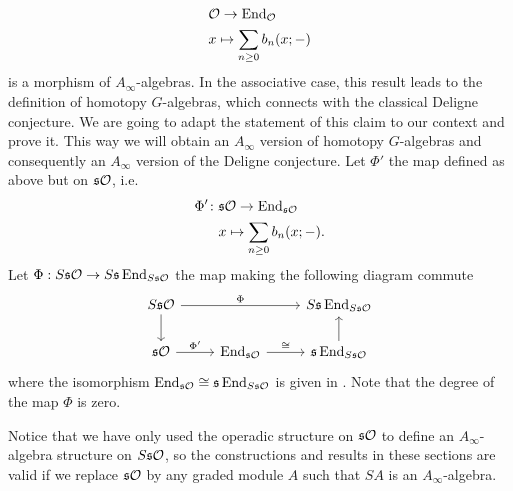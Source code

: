 \documentclass[Thesis.tex]{subfiles}
\begin{document}
\begin{align*}
&{\mathcal O} \to \operatorname{End}_{\mathcal O}\\
&x\mapsto \sum_{n\geq 0}b_n(x;-)
\end{align*}
is a morphism of $A_\infty$-algebras. In the associative case, this result leads to the definition of homotopy $G$-algebras, which connects with the classical Deligne conjecture. We are going to adapt the statement of this claim to our context and prove it. This way we will obtain an $A_\infty$ version of homotopy $G$-algebras and consequently an $A_\infty$ version of the Deligne conjecture. Let $\Phi'$ the map defined as above but on $\mathfrak{s}{\mathcal O}$, i.e.
\begin{align*}
\Phi'\colon&\mathfrak{s}{\mathcal O} \to \operatorname{End}_{\mathfrak{s}{\mathcal O}}\\
&x\mapsto \sum_{n\geq 0}b_n(x;-).
\end{align*}
Let $\Phi:S\mathfrak{s}{\mathcal O}\to S\mathfrak{s}\operatorname{End}_{S\mathfrak{s}{\mathcal O}}$ the map making the following diagram commute
\begin{equation}\label{Phi}
\begin{tikzcd}
S\s\OO\arrow[rr, "\Phi"]\arrow[d] & & S\s\End_{S\s\OO}\\
\s\OO\arrow[r, "\Phi'"]& \End_{\s\OO}\arrow[r, "\cong"]& \s\End_{S\s\OO}\arrow[u]
\end{tikzcd}
\end{equation}
where the isomorphism $\operatorname{End}_{\mathfrak{s}{\mathcal O}}\cong\mathfrak{s}\operatorname{End}_{S\mathfrak{s}{\mathcal O}}$ is given in . Note that the degree of the map $\Phi$ is zero.

\begin{remark}
Notice that we have only used the operadic structure on $\mathfrak{s}{\mathcal O}$ to define an $A_\infty$-algebra structure on $S\mathfrak{s}{\mathcal O}$, so the constructions and results in these sections are valid if we replace $\mathfrak{s}{\mathcal O}$ by any graded module $A$ such that $SA$ is an $A_\infty$-algebra. 
\end{remark}
\end{document}
